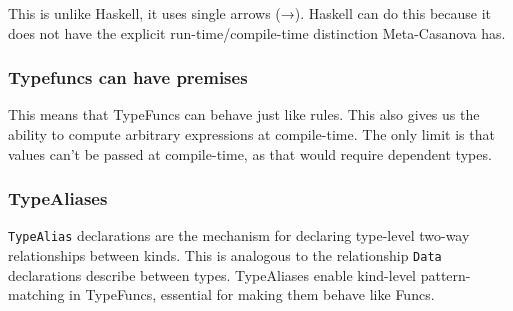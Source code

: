\begin{multicols}{2}
  This is unlike Haskell, it uses single arrows (→).
  Haskell can do this because it does not have the explicit run-time/compile-time distinction Meta-Casanova has.

  \subsubsection*{Typefuncs can have premises}
  This means that TypeFuncs can behave just like rules.
  This also gives us the ability to compute arbitrary expressions at compile-time.
  The only limit is that values can't be passed at compile-time, as that would require dependent types.

  \subsubsection*{TypeAliases}
  \texttt{TypeAlias} declarations are the mechanism for declaring type-level two-way relationships between kinds.
  This is analogous to the relationship \texttt{Data} declarations describe between types.
  TypeAliases enable kind-level pattern-matching in TypeFuncs, essential for making them behave like Funcs.


\end{multicols}

\pagebreak
